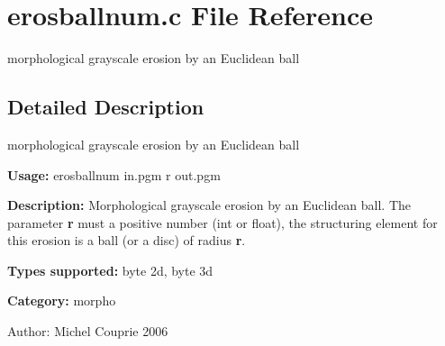 \section{erosballnum.c File Reference}
\label{erosballnum_8c}
morphological grayscale erosion by an Euclidean ball 



\subsection{Detailed Description}
morphological grayscale erosion by an Euclidean ball 

{\bf Usage:} erosballnum in.pgm r out.pgm

{\bf Description:} Morphological grayscale erosion by an Euclidean ball. The parameter {\bf r} must a positive number (int or float), the structuring element for this erosion is a ball (or a disc) of radius {\bf r}.

{\bf Types supported:} byte 2d, byte 3d

{\bf Category:} morpho

\begin{Desc}
\item[Author:]Michel Couprie 2006 \end{Desc}
